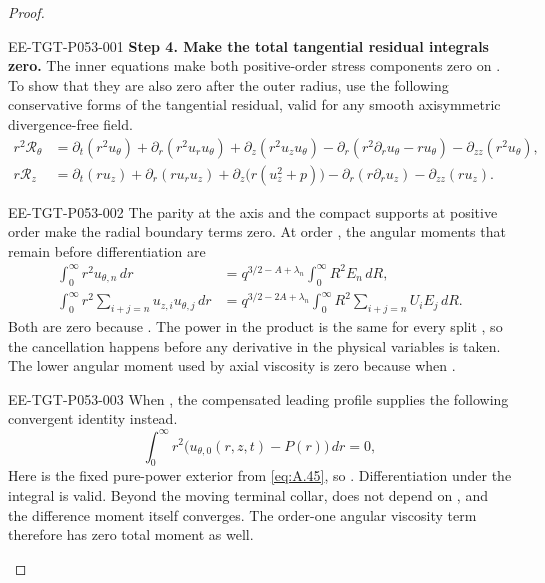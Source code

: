 \begin{proof}
%
\begin{EESegment}{EE-TGT-P053-001}
\textbf{Step 4. Make the total tangential residual integrals zero.}
The inner equations make both positive-order stress components zero on . To show that
they are also zero after the outer radius, use the following conservative forms of the tangential residual, valid for any
smooth axisymmetric divergence-free field.
\[
\begin{aligned}
r^2\mathscr R_\theta
&=\partial_t(r^2u_\theta)
  +\partial_r(r^2u_ru_\theta)
  +\partial_z(r^2u_zu_\theta)
  -\partial_r(r^2\partial_ru_\theta-ru_\theta)
  -\partial_{zz}(r^2u_\theta),\\
r\mathscr R_z
&=\partial_t(ru_z)
  +\partial_r(ru_ru_z)
  +\partial_z\bigl(r(u_z^2+p)\bigr)
  -\partial_r(r\partial_ru_z)
  -\partial_{zz}(ru_z).
\end{aligned}
\]
\end{EESegment}

\begin{EESegment}{EE-TGT-P053-002}
The parity at the axis and the compact supports at positive order make the radial boundary terms zero. At order
, the angular moments that remain before differentiation are
\[
\begin{aligned}
\int_0^\infty r^2u_{\theta,n}\,dr
&=q^{3/2-A+\lambda_n}\int_0^\infty R^2E_n\,dR,\\
\int_0^\infty r^2\sum_{i+j=n}u_{z,i}u_{\theta,j}\,dr
&=q^{3/2-2A+\lambda_n}\int_0^\infty R^2\sum_{i+j=n}U_iE_j\,dR.
\end{aligned}
\]
Both are zero because . The power in the product is the same for every
split , so the cancellation happens before any derivative in the physical variables
 is taken. The lower angular moment used by axial viscosity is zero because
 when .
\end{EESegment}

\begin{EESegment}{EE-TGT-P053-003}
When , the compensated leading profile supplies the following convergent identity instead.
\begin{equation}\label{eq:5.19}
\int_0^\infty r^2\bigl(u_{\theta,0}(r,z,t)-P(r)\bigr)\,dr=0,
\tag{5.19}
\end{equation}
Here  is the fixed pure-power exterior from \eqref{eq:A.45}, so
. Differentiation under the integral is valid. Beyond the moving terminal collar,
 does not depend on , and the difference moment itself
converges. The order-one angular viscosity term therefore has zero total moment as well.
\end{EESegment}


\end{proof}
